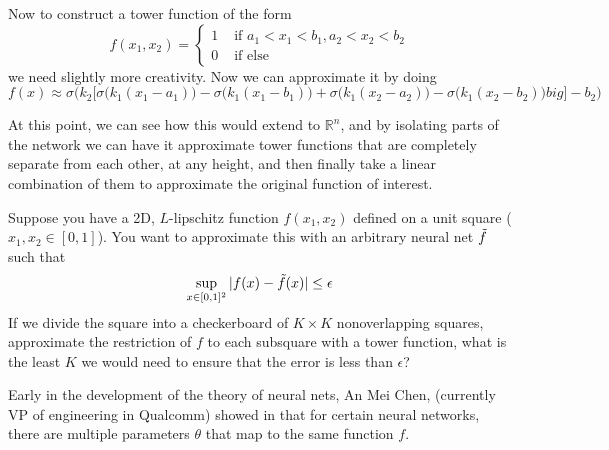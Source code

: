\documentclass{article}
\begin{document}
  \begin{example} 
    Now to construct a tower function of the form 
    \begin{equation}
      f(x_1, x_2) = \begin{cases} 1 & \text{ if } a_1 < x_1 < b_1, a_2 < x_2 < b_2 \\ 0 & \text{ if else} \end{cases}
    \end{equation}
    we need slightly more creativity. Now we can approximate it by doing 
    \begin{equation}
      f(x) \approx \sigma \bigg( k_2 \big[ \sigma\big( k_1 (x_1 - a_1)\big) - \sigma\big( k_1 (x_1 -b_1)\big) + \sigma \big( k_1 (x_2 - a_2)\big) - \sigma\big(k_1 (x_2 - b_2)\big)  big] - b_2\bigg)
    \end{equation}
  \end{example} 

  At this point, we can see how this would extend to $\mathbb{R}^n$, and by isolating parts of the network we can have it approximate tower functions that are completely separate from each other, at any height, and then finally take a linear combination of them to approximate the original function of interest.  

  \begin{theorem}[CS671 Fall 2023 PS5]
    Suppose you have a 2D, $L$-lipschitz function $f(x_1, x_2)$ defined on a unit square ($x_1, x_2 \in \left [0,1 \right ]$). You want to approximate this with an arbitrary neural net $\Tilde{f}$ such that
    \begin{equation}
      \sup_{x \in [0, 1]^2} |f(x) - \Tilde{f}(x)| \leq \epsilon
    \end{equation}
    If we divide the square into a checkerboard of $K \times K$ nonoverlapping squares, approximate the restriction of $f$ to each subsquare with a tower function, what is the least $K$ we would need to ensure that the error is less than $\epsilon$? 
  \end{theorem} 

  Early in the development of the theory of neural nets, An Mei Chen, (currently VP of engineering in Qualcomm) showed in \cite{symmetry} that for certain neural networks, there are multiple parameters $\theta$ that map to the same function $f$. 
\end{document}
